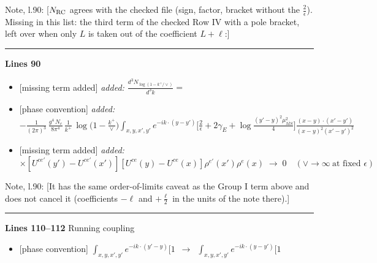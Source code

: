 \documentclass[10pt]{article}
\newenvironment{notebox}{\def\FrameCommand{{\color{notebar}\vrule width 1.5pt}\hspace{6pt}}\MakeFramed{\advance\hsize-\width\FrameRestore}\small}{\endMakeFramed}
\begin{document}
\begin{notebox}\textsf{\small Note, l.90:} [$N_{\rm RC}$ agrees with the checked file (sign, factor, bracket without the $\frac{2}{\epsilon}$). Missing in this list: the third term of the checked Row IV with a pole bracket, left over when only $L$ is taken out of the coefficient $L+\ell$:]\end{notebox}
\noindent\rule{\linewidth}{0.3pt}\par\noindent\textbf{Lines 90} \par
\begin{itemize}[leftmargin=2.2em,itemsep=1pt,topsep=2pt]
\item[\textbf{l.90}] \textsf{\small [missing term added]} \emph{added:} $\displaystyle \frac{d^{3}N_{\log(1-k^{+}/\vee)}}{d^{3}k}=$
\item[\textbf{l.90}] \textsf{\small [phase convention]} \emph{added:} $\displaystyle -\frac{1}{(2\pi)^{3}}\,\frac{g^{4}\,N_{c}}{8\pi^{4}}\,\frac{1}{k^{+}}\,\log\Big(1-\frac{k^{+}}{\vee}\Big)\int_{x,y,x',y'}e^{-ik\cdot(y-y')}\Big[\frac{2}{\epsilon}+2\gamma_{E}+\log\frac{(y'-y)^{2}\mu^{2}_{\overline{MS}}}{4}\Big]\frac{(x-y)\cdot(x'-y')}{(x-y)^{2}(x'-y')^{2}}$
\item[\textbf{l.90}] \textsf{\small [missing term added]} \emph{added:} $\displaystyle \times[U^{ce'}(y') - U^{ce'}(x')][U^{ce}(y) - U^{ce}(x)]\rho^{e'}(x')\rho^{e}(x)\;\longrightarrow\;0\quad(\vee\to\infty\ \text{at fixed }\epsilon)$
\end{itemize}
\begin{notebox}\textsf{\small Note, l.90:} [It has the same order-of-limits caveat as the Group I term above and does not cancel it (coefficients $-\ell$ and $+\frac{\ell}{2}$ in the units of the note there).]\end{notebox}
\noindent\rule{\linewidth}{0.3pt}\par\noindent\textbf{Lines 110--112} \quad \textsf{Running coupling} \par
\begin{itemize}[leftmargin=2.2em,itemsep=1pt,topsep=2pt]
\item[\textbf{l.110}] \textsf{\small [phase convention]} $\displaystyle \int_{x,y,x',y'}e^{-ik\cdot(y'-y)}[1$\ $\longrightarrow$\ $\displaystyle \int_{x,y,x',y'}e^{-ik\cdot(y-y')}[1$
\end{itemize}
\end{document}
